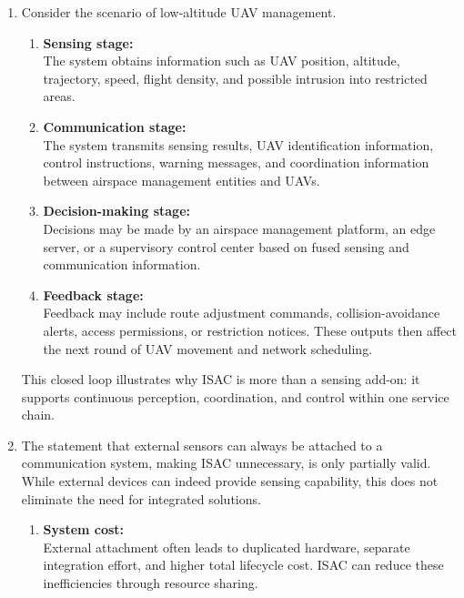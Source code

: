 \begin{enumerate}[label=\textbf{\arabic*.}, leftmargin=*]
    Therefore, the value of ISAC in deployment efficiency is especially prominent in scenarios where scale, speed, and coordination matter.

    \item 
    Consider the scenario of low-altitude UAV management.

    \begin{enumerate}[label=(\alph*)]
        \item \textbf{Sensing stage:} \\
        The system obtains information such as UAV position, altitude, trajectory, speed, flight density, and possible intrusion into restricted areas.

        \item \textbf{Communication stage:} \\
        The system transmits sensing results, UAV identification information, control instructions, warning messages, and coordination information between airspace management entities and UAVs.

        \item \textbf{Decision-making stage:} \\
        Decisions may be made by an airspace management platform, an edge server, or a supervisory control center based on fused sensing and communication information.

        \item \textbf{Feedback stage:} \\
        Feedback may include route adjustment commands, collision-avoidance alerts, access permissions, or restriction notices. These outputs then affect the next round of UAV movement and network scheduling.
    \end{enumerate}

    This closed loop illustrates why ISAC is more than a sensing add-on: it supports continuous perception, coordination, and control within one service chain.

    \item 
    The statement that external sensors can always be attached to a communication system, making ISAC unnecessary, is only partially valid. While external devices can indeed provide sensing capability, this does not eliminate the need for integrated solutions.

    \begin{enumerate}[label=(\alph*)]
        \item \textbf{System cost:} \\
        External attachment often leads to duplicated hardware, separate integration effort, and higher total lifecycle cost. ISAC can reduce these inefficiencies through resource sharing.


\end{enumerate}
\end{enumerate}
